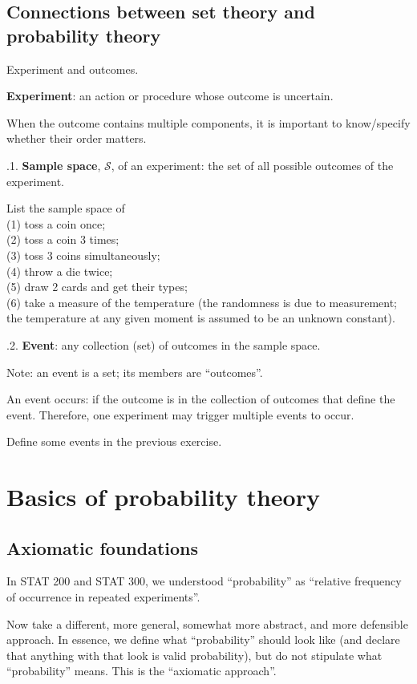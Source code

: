 \documentclass[12pt]{article}
\begin{document}
\subsection*{Connections between set theory and probability theory}

Experiment and outcomes.

\textbf{Experiment}: an action or procedure whose outcome is uncertain.

When the outcome contains multiple components,
it is important to know/specify whether their order matters.

.1.
\textbf{Sample space}, $\mathcal{S}$, of an experiment:
the set of all possible outcomes of the experiment.

\exercise List the sample space of\\
(1) toss a coin once;\\
(2) toss a coin 3 times;\\
(3) toss 3 coins simultaneously;\\
(4) throw a die twice;\\
(5) draw 2 cards and get their types;\\
(6) take a measure of the temperature (the randomness is due to
measurement; the temperature at any given moment is assumed to be an
unknown constant).

.2. \textbf{Event}:
any collection (\ie set) of outcomes in the sample space.

Note: an event is a set; its members are ``outcomes''.

An event occurs: if the outcome is in the collection of
outcomes that define the event. Therefore, one experiment may trigger
multiple events to occur.

\exercise Define some events in the previous exercise.


\section{Basics of probability theory}
\subsection{Axiomatic foundations}

In STAT 200 and STAT 300, we understood ``probability''
as ``relative frequency of occurrence in repeated experiments''.

Now take a different, more general, somewhat more abstract, and more defensible
approach. In essence, we define what ``probability'' should look like
(and declare that anything with that look is valid probability),
but do not stipulate what ``probability'' means.
This is the ``axiomatic approach''.
\end{document}
